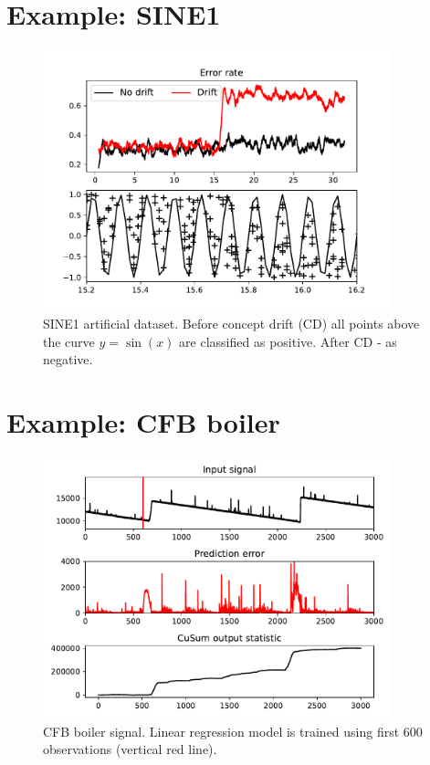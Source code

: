 \documentclass[doctoral,utf8,lot,loar,lof,shortloft,index]{jydiss}
\begin{document}
\section{Example: SINE1}
\begin{figure}[!htb]
	\centering
	\includegraphics[width=0.9\textwidth]{images/cd_example_sine1}
	\caption{SINE1 artificial dataset. 
		Before concept drift (CD) all points above the curve $y=\sin(x)$ are classified as positive.
After CD - as negative.	
}\label{fig:sine1}
\end{figure}

\section{Example: CFB boiler}
\begin{figure}[!htb]
	\centering
	\includegraphics[width=0.9\textwidth]{images/boiler_fixed_train}
	\caption{CFB boiler signal.
Linear regression model is trained using first 600 observations (vertical red line).	
}\label{fig:boiler_fixed_train}
\end{figure}
\end{document}
